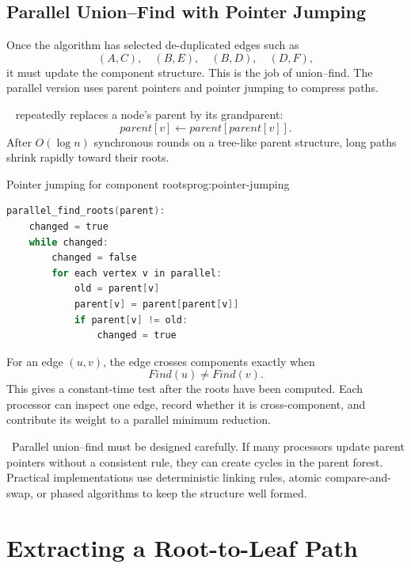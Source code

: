 \subsection{Parallel Union--Find with Pointer Jumping}
\label{sec:union-find-pointer-jumping}

Once the algorithm has selected de-duplicated edges such as
\[
    (A,C),\quad (B,E),\quad (B,D),\quad (D,F),
\]
it must update the component structure.
This is the job of union--find.
The parallel version uses parent pointers and pointer jumping to compress paths.

\begin{ppdefn}
\  repeatedly replaces a node's parent by its grandparent:
\[
    parent[v] \gets parent[parent[v]].
\]
After \(O(\log n)\) synchronous rounds on a tree-like parent structure, long paths shrink rapidly toward their roots.
\end{ppdefn}

\begin{ppprogram}{Pointer jumping for component roots}{prog:pointer-jumping}
\begin{lstlisting}[language=C]
parallel_find_roots(parent):
    changed = true
    while changed:
        changed = false
        for each vertex v in parallel:
            old = parent[v]
            parent[v] = parent[parent[v]]
            if parent[v] != old:
                changed = true
\end{lstlisting}
\end{ppprogram}

For an edge \((u,v)\), the edge crosses components exactly when
\[
    Find(u) \neq Find(v).
\]
This gives a constant-time test after the roots have been computed.
Each processor can inspect one edge, record whether it is cross-component, and contribute its weight to a parallel minimum reduction.

\begin{pppitfall}
\ Parallel union--find must be designed carefully.
If many processors update parent pointers without a consistent rule, they can create cycles in the parent forest.
Practical implementations use deterministic linking rules, atomic compare-and-swap, or phased algorithms to keep the structure well formed.
\end{pppitfall}

\section{Extracting a Root-to-Leaf Path}
\label{sec:extract-root-leaf-path}

